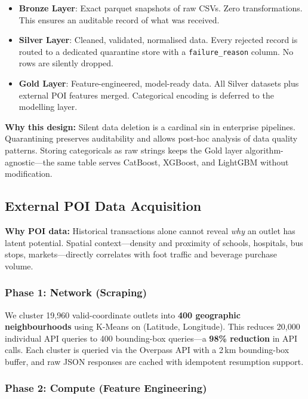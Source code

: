 \documentclass[10.75pt, a4paper]{article}
\begin{document}
\begin{itemize}
    \item \textbf{Bronze Layer}: Exact parquet snapshots of raw CSVs. Zero transformations. This ensures an auditable record of what was received.
    \item \textbf{Silver Layer}: Cleaned, validated, normalised data. Every rejected record is routed to a dedicated quarantine store with a \texttt{failure\_reason} column. No rows are silently dropped.
    \item \textbf{Gold Layer}: Feature-engineered, model-ready data. All Silver datasets plus external POI features merged. Categorical encoding is deferred to the modelling layer.
\end{itemize}

\textbf{Why this design:} Silent data deletion is a cardinal sin in enterprise pipelines. Quarantining preserves auditability and allows post-hoc analysis of data quality patterns. Storing categoricals as raw strings keeps the Gold layer algorithm-agnostic---the same table serves CatBoost, XGBoost, and LightGBM without modification.

\subsection{External POI Data Acquisition}

\textbf{Why POI data:} Historical transactions alone cannot reveal \textit{why} an outlet has latent potential. Spatial context---density and proximity of schools, hospitals, bus stops, markets---directly correlates with foot traffic and beverage purchase volume.

\subsubsection{Phase 1: Network (Scraping)}

We cluster 19,960 valid-coordinate outlets into \textbf{400 geographic neighbourhoods} using K-Means on (Latitude, Longitude). This reduces 20,000 individual API queries to 400 bounding-box queries---a \textbf{98\% reduction} in API calls. Each cluster is queried via the Overpass API with a 2\,km bounding-box buffer, and raw JSON responses are cached with idempotent resumption support.

\subsubsection{Phase 2: Compute (Feature Engineering)}
\end{document}
